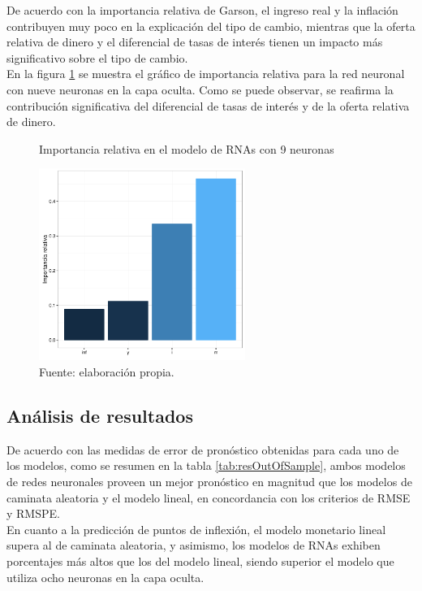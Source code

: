 De acuerdo con la importancia relativa de Garson, el ingreso real y la inflación contribuyen muy poco en la explicación del tipo de cambio, mientras que la oferta relativa de dinero y el diferencial de tasas de interés tienen un impacto más significativo sobre el tipo de cambio.\\

\newpage
En la figura \ref{fig:importrel19} se muestra el gráfico de importancia relativa para la red neuronal con nueve neuronas en la capa oculta. Como se puede observar, se reafirma la contribución significativa del diferencial de tasas de interés y de la oferta relativa de dinero.

\begin{figure}[htb]
	\centering
	\caption{Importancia relativa en el modelo de RNAs con 9 neuronas}
	\label{fig:importrel19}
	\includegraphics[width=0.6\textwidth]{figuras/garson_19.pdf}
	\caption*{Fuente: elaboración propia.}
\end{figure}

\clearpage
\subsection{Análisis de resultados}
De acuerdo con las medidas de error de pronóstico obtenidas para cada uno de los modelos, como se resumen en la tabla \ref{tab:resOutOfSample}, ambos modelos de redes neuronales proveen un mejor pronóstico en magnitud que los modelos de caminata aleatoria y el modelo lineal, en concordancia con los criterios de RMSE y RMSPE.\\



En cuanto a la predicción de puntos de inflexión, el modelo monetario lineal supera al de caminata aleatoria, y asimismo, los modelos de RNAs exhiben porcentajes más altos que los del modelo lineal, siendo superior el modelo que utiliza ocho neuronas en la capa oculta.\\

